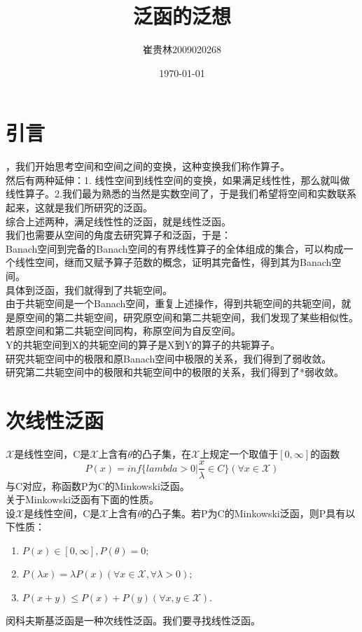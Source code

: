 \documentclass[a4paper,12pt]{article}
\title{泛函的泛想}
\author{崔贵林2009020268}
\date{\today}
\begin{document}
\begin{CJK*}{UTF8}{gbsn}
	\maketitle
	\section{引言}
	\quad{}，我们开始思考空间和空间之间的变换，这种变换我们称作算子。\\
	然后有两种延伸：1. 线性空间到线性空间的变换，如果满足线性性，那么就叫做线性算子。2.我们最为熟悉的当然是实数空间了，于是我们希望将空间和实数联系起来，这就是我们所研究的泛函。\\
	综合上述两种，满足线性性的泛函，就是线性泛函。\\
	我们也需要从空间的角度去研究算子和泛函，于是：\\
	Banach空间到完备的Banach空间的有界线性算子的全体组成的集合，可以构成一个线性空间，继而又赋予算子范数的概念，证明其完备性，得到其为Banach空间。\\
	具体到泛函，我们就得到了共轭空间。\\
	由于共轭空间是一个Banach空间，重复上述操作，得到共轭空间的共轭空间，就是原空间的第二共轭空间，研究原空间和第二共轭空间，我们发现了某些相似性。若原空间和第二共轭空间同构，称原空间为自反空间。\\
	Y的共轭空间到X的共轭空间的算子是X到Y的算子的共轭算子。\\
	研究共轭空间中的极限和原Banach空间中极限的关系，我们得到了弱收敛。\\
	研究第二共轭空间中的极限和共轭空间中的极限的关系，我们得到了*弱收敛。\\
	\section{次线性泛函}
	\quad{}$\mathcal{X}$是线性空间，C是$\mathcal{X}$上含有$\theta$的凸子集，在$\mathcal{X}$上规定一个取值于$[0,\infty]$的函数
	$$P(x) = inf\{lambda>0|\frac{x}{\lambda}\in C\} (\forall x \in \mathcal{X})$$
	与C对应，称函数P为C的Minkowski泛函。\\
	关于Minkowski泛函有下面的性质。\\
	设$\mathcal{X}$是线性空间，C是$\mathcal{X}$上含有$\theta$的凸子集。若P为C的Minkowski泛函，则P具有以下性质：
	\begin{enumerate}
		\item $P(x) \in [0,\infty], P(\theta) = 0;$
		\item $P(\lambda x) = \lambda P(x) (\forall x \in \mathcal{X},\forall \lambda > 0)$;
		\item $P(x+y) \le P(x) + P(y) (\forall x,y \in \mathcal{X})$.
	\end{enumerate}
	闵科夫斯基泛函是一种次线性泛函。我们要寻找线性泛函。

\end{CJK*}
\end{document}
